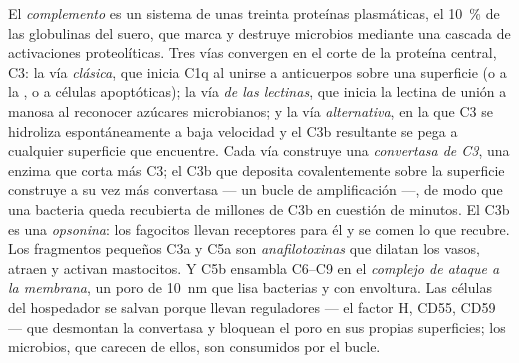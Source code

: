 \begin{definition}[Complemento]\label{def:b3:innate-immunity:complement}
El \emph{complemento} es un sistema de unas treinta proteínas
plasmáticas, el \qty{10}{\%} de las globulinas del suero, que marca y
destruye microbios mediante una cascada de activaciones proteolíticas.
Tres vías convergen en el corte de la proteína central, C3: la vía
\emph{clásica}, que inicia C1q al unirse a anticuerpos sobre una
superficie (o a la , o a células apoptóticas); la vía
\emph{de las lectinas}, que inicia la lectina de unión a manosa al
reconocer azúcares microbianos; y la vía \emph{alternativa}, en la que C3
se hidroliza espontáneamente a baja velocidad y el C3b resultante se pega
a cualquier superficie que encuentre. Cada vía construye una
\emph{convertasa de C3}, una enzima que corta más C3; el C3b que deposita
covalentemente sobre la superficie construye a su vez más convertasa ---
un bucle de amplificación ---, de modo que una bacteria queda recubierta
de millones de C3b en cuestión de minutos. El C3b es una
\emph{opsonina}: los fagocitos llevan receptores para él y se comen lo
que recubre. Los fragmentos pequeños C3a y C5a son \emph{anafilotoxinas}
que dilatan los vasos, atraen  y activan mastocitos. Y C5b
ensambla C6--C9 en el \emph{complejo de ataque a la membrana}, un poro de
\qty{10}{nm} que lisa bacterias  y  con envoltura. Las
células del hospedador se salvan porque llevan reguladores --- el factor
H, CD55, CD59 --- que desmontan la convertasa y bloquean el poro en sus
propias superficies; los microbios, que carecen de ellos, son consumidos
por el bucle.
\end{definition}

